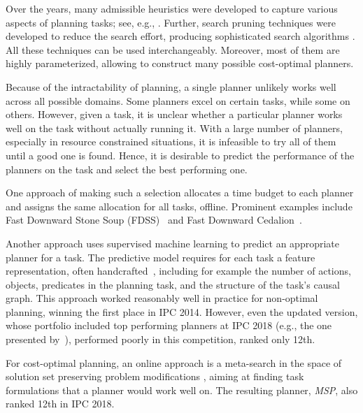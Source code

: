 \documentclass[letterpaper]{article} %
\begin{document}
Over the years, many admissible heuristics were developed to capture
various aspects of planning tasks; see, e.g.,
\cite{edelkamp-ecp2001,helmert-et-al-jacm2014,helmert-domshlak-icaps2009,haslum-et-al-aaai2005}.
Further, search pruning techniques
\cite{wehrle-helmert-icaps2014,shleyfman-et-al-aaai2015}
were developed to reduce the search effort, producing sophisticated
search algorithms
\cite{edelkamp-et-al-aaai2015,gnad-hoffmann-icaps2015}.
All these techniques can be used interchangeably. Moreover, most of
them are highly parameterized, allowing to construct many possible
cost-optimal planners.

Because of the intractability of planning, a single planner unlikely
works well across all possible domains. Some planners excel on certain
tasks, while some on others. However, given a task, it is unclear
whether a particular planner works well on the task without actually
running it.  With a large number of planners, especially in resource
constrained situations, it is infeasible to try all of them until a
good one is found. Hence, it is desirable to predict the performance
of the planners on the task and select the best performing one.

One approach of making such a selection allocates a time budget to
each planner and assigns the same allocation for all tasks,
offline. Prominent examples include Fast Downward Stone Soup
(FDSS)~\cite{helmert-et-al-ipc2011} and Fast Downward
Cedalion~\cite{seipp-et-al-ipc2014b}.

Another approach uses supervised machine learning to predict an
appropriate planner for a task. The predictive model requires for each
task a feature representation, often
handcrafted~\cite{howe-et-al-ecp1999,cenamor-et-al-jair2016},
including for example the number of actions, objects, predicates in
the planning task, and the structure of the task's causal graph. This
approach worked reasonably well in practice for non-optimal planning,
winning the first place in IPC 2014. However, even the updated
version, whose portfolio included top performing planners at IPC 2018
(e.g., the one presented by~\cite{katz-hoffmann-ipc2014}), performed
poorly in this competition, ranked only 12th.

For cost-optimal planning, an online approach is a meta-search in the
space of solution set preserving problem
modifications \cite{fuentetaja-et-al-ipc2018}, aiming at finding task
formulations that a planner would work well on. The resulting
planner, \emph{MSP}, also ranked 12th in IPC 2018.
\end{document}

